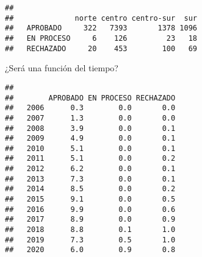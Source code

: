 \documentclass[
]{article}
\begin{document}
\begin{verbatim}
##             
##              norte centro centro-sur  sur
##   APROBADO     322   7393       1378 1096
##   EN PROCESO     6    126         23   18
##   RECHAZADO     20    453        100   69
\end{verbatim}

¿Será una función del tiempo?

\begin{verbatim}
##       
##        APROBADO EN PROCESO RECHAZADO
##   2006      0.3        0.0       0.0
##   2007      1.3        0.0       0.0
##   2008      3.9        0.0       0.1
##   2009      4.9        0.0       0.1
##   2010      5.1        0.0       0.1
##   2011      5.1        0.0       0.2
##   2012      6.2        0.0       0.1
##   2013      7.3        0.0       0.1
##   2014      8.5        0.0       0.2
##   2015      9.1        0.0       0.5
##   2016      9.9        0.0       0.6
##   2017      8.9        0.0       0.9
##   2018      8.8        0.1       1.0
##   2019      7.3        0.5       1.0
##   2020      6.0        0.9       0.8
\end{verbatim}
\end{document}
